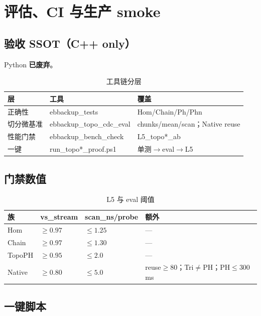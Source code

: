 \chapter{评估、CI 与生产 smoke}
\label{ch:eval}

\section{验收 SSOT（C++ only）}

Python  \textbf{已废弃}。

\begin{table}[htbp]
\centering
\caption{工具链分层}
\label{tab:ssot}
\begin{tabular}{@{}llp{6.2cm}@{}}
\toprule
层 & 工具 & 覆盖 \\
\midrule
正确性 & ebbackup\_tests & Hom/Chain/Ph/Phn \\
切分微基准 & ebbackup\_topo\_cdc\_eval & chunks/mean/scan；Native reuse \\
性能门禁 & ebbackup\_bench\_check & L5\_topo*\_ab \\
一键 & run\_topo*\_proof.ps1 & 单测$\to$eval$\to$L5 \\
\bottomrule
\end{tabular}
\end{table}

\section{门禁数值}

\begin{table}[htbp]
\centering
\caption{L5 与 eval 阈值}
\label{tab:gates}
\begin{tabular}{@{}llll@{}}
\toprule
族 & vs\_stream & scan\_ns/probe & 额外 \\
\midrule
Hom & $\ge0.97$ & $\le1.25$ & — \\
Chain & $\ge0.97$ & $\le1.30$ & — \\
TopoPH & $\ge0.95$ & $\le2.0$ & — \\
Native & $\ge0.80$ & $\le5.0$ & reuse$\ge80$；Tri$\neq$PH；PH$\le300$ms \\
\bottomrule
\end{tabular}
\end{table}

\section{一键脚本}

